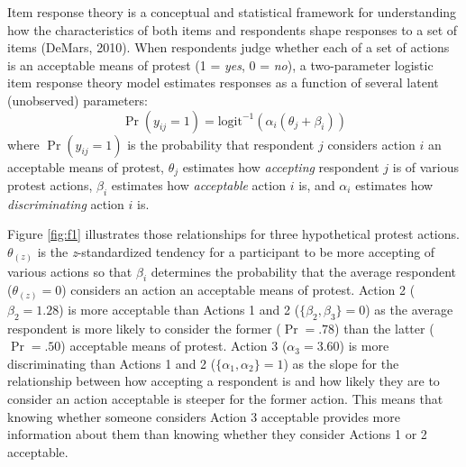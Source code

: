 \documentclass[12pt, letterpaper]{article}
\begin{document}
Item response theory is a conceptual and statistical framework for
understanding how the characteristics of both items and respondents
shape responses to a set of items (DeMars, 2010). When respondents judge
whether each of a set of actions is an acceptable means of protest (1 =
\emph{yes}, 0 = \emph{no}), a two-parameter logistic item response
theory model estimates responses as a function of several latent
(unobserved) parameters:
\[ \Pr ( y_\textit{ij} = 1 ) = \text{logit}^{-1} ( \alpha_i ( \theta_j + \beta_i ) ) \]
where \(\Pr ( y_\textit{ij} = 1 )\) is the probability that respondent
\(j\) considers action \(i\) an acceptable means of protest,
\(\theta_j\) estimates how \emph{accepting} respondent \(j\) is of
various protest actions, \(\beta_i\) estimates how \emph{acceptable}
action \(i\) is, and \(\alpha_i\) estimates how \emph{discriminating}
action \(i\) is.

Figure \ref{fig:f1} illustrates those relationships for three
hypothetical protest actions. \(\theta_{(z)}\) is the
\emph{z}-standardized tendency for a participant to be more accepting of
various actions so that \(\beta_i\) determines the probability that the
average respondent (\(\theta_{(z)} = 0\)) considers an action an
acceptable means of protest. Action 2 (\(\beta_2 = 1.28\)) is more
acceptable than Actions 1 and 2 (\(\{ \beta_2, \beta_3 \} = 0\)) as the
average respondent is more likely to consider the former (\(\Pr = .78\))
than the latter (\(\Pr = .50\)) acceptable means of protest. Action 3
(\(\alpha_3 = 3.60\)) is more discriminating than Actions 1 and 2
(\(\{ \alpha_1, \alpha_2 \} = 1\)) as the slope for the relationship
between how accepting a respondent is and how likely they are to
consider an action acceptable is steeper for the former action. This
means that knowing whether someone considers Action 3 acceptable
provides more information about them than knowing whether they consider
Actions 1 or 2 acceptable.
\end{document}
